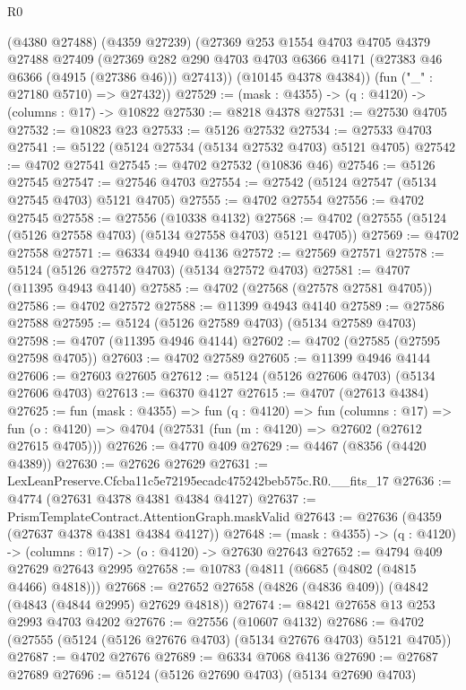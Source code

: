 \begin{lexlean}{R0}
\begin{coremodule}
        (@4380 @27488)
        (@4359 @27239)
        (@27369
          @253
          @1554
          @4703
          @4705
          @4379
          @27488
          @27409
          (@27369 @282 @290 @4703 @4703 @6366 @4171 (@27383 @46 @6366 (@4915 (@27386 @46))) @27413))
        (@10145 @4378 @4384))
      (fun ("_" : @27180 @5710) => @27432))
@27529 := (mask : @4355) -> (q : @4120) -> (columns : @17) -> @10822
@27530 := @8218 @4378
@27531 := @27530 @4705
@27532 := @10823 @23
@27533 := @5126 @27532
@27534 := @27533 @4703
@27541 := @5122 (@5124 @27534 (@5134 @27532 @4703) @5121 @4705)
@27542 := @4702 @27541
@27545 := @4702 @27532 (@10836 @46)
@27546 := @5126 @27545
@27547 := @27546 @4703
@27554 := @27542 (@5124 @27547 (@5134 @27545 @4703) @5121 @4705)
@27555 := @4702 @27554
@27556 := @4702 @27545
@27558 := @27556 (@10338 @4132)
@27568 := @4702 (@27555 (@5124 (@5126 @27558 @4703) (@5134 @27558 @4703) @5121 @4705))
@27569 := @4702 @27558
@27571 := @6334 @4940 @4136
@27572 := @27569 @27571
@27578 := @5124 (@5126 @27572 @4703) (@5134 @27572 @4703)
@27581 := @4707 (@11395 @4943 @4140)
@27585 := @4702 (@27568 (@27578 @27581 @4705))
@27586 := @4702 @27572
@27588 := @11399 @4943 @4140
@27589 := @27586 @27588
@27595 := @5124 (@5126 @27589 @4703) (@5134 @27589 @4703)
@27598 := @4707 (@11395 @4946 @4144)
@27602 := @4702 (@27585 (@27595 @27598 @4705))
@27603 := @4702 @27589
@27605 := @11399 @4946 @4144
@27606 := @27603 @27605
@27612 := @5124 (@5126 @27606 @4703) (@5134 @27606 @4703)
@27613 := @6370 @4127
@27615 := @4707 (@27613 @4384)
@27625 := fun (mask : @4355) =>
  fun (q : @4120) =>
  fun (columns : @17) =>
  fun (o : @4120) => @4704 (@27531 (fun (m : @4120) => @27602 (@27612 @27615 @4705)))
@27626 := @4770 @409
@27629 := @4467 (@8356 (@4420 @4389))
@27630 := @27626 @27629
@27631 := LexLeanPreserve.Cfcba11c5e72195ecadc475242beb575c.R0.__fits_17
@27636 := @4774 (@27631 @4378 @4381 @4384 @4127)
@27637 := PrismTemplateContract.AttentionGraph.maskValid
@27643 := @27636 (@4359 (@27637 @4378 @4381 @4384 @4127))
@27648 := (mask : @4355) -> (q : @4120) -> (columns : @17) -> (o : @4120) -> @27630 @27643
@27652 := @4794 @409 @27629 @27643 @2995
@27658 := @10783 (@4811 (@6685 (@4802 (@4815 @4466) @4818)))
@27668 := @27652 @27658 (@4826 (@4836 @409)) (@4842 (@4843 (@4844 @2995) @27629 @4818))
@27674 := @8421 @27658 @13 @253 @2993 @4703 @4202
@27676 := @27556 (@10607 @4132)
@27686 := @4702 (@27555 (@5124 (@5126 @27676 @4703) (@5134 @27676 @4703) @5121 @4705))
@27687 := @4702 @27676
@27689 := @6334 @7068 @4136
@27690 := @27687 @27689
@27696 := @5124 (@5126 @27690 @4703) (@5134 @27690 @4703)

\end{coremodule}
\end{lexlean}
